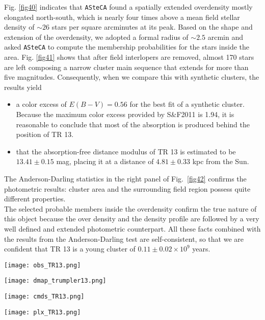 \documentclass[draft]{aa}
\begin{document}
Fig. \ref{fig40} indicates that \texttt{ASteCA} found a spatially extended
overdensity mostly elongated north-south, which is nearly four times
above a mean field stellar density of $\sim26$ stars per square arcminutes at
its peak. Based on the shape and extension of the overdensity, we adopted a
formal radius of $\sim2.5$ arcmin and asked \texttt{ASteCA} to compute the
membership probabilities for the stars inside the area. 
Fig. \ref{fig41} shows that after field interlopers are removed, almost 170
stars are left composing a narrow cluster main sequence that extends for more than
five magnitudes. Consequently, when we compare this with synthetic clusters,
the results yield

\begin{itemize}
\item [a)] a color excess of $E(B-V)=0.56$  for the best fit
of a synthetic cluster. Because the maximum color excess provided by S\&F2011
is 1.94, it is reasonable to conclude that most of the absorption is produced
behind the position of TR 13.
\item [b)] that the absorption-free distance modulus of TR 13 is estimated to be
$13.41\pm0.15$ mag, placing it at a distance of $4.81\pm0.33$ kpc from
the Sun.
\end{itemize}

The Anderson-Darling statistics in the right panel of Fig.~\ref{fig42} confirms the
photometric results: cluster area and the surrounding field region
possess quite different properties.\\

The selected probable members inside the overdensity confirm the
true nature of this object because the over density and the density profile are
followed by a very well defined and extended photometric counterpart. All these
facts combined with the results from the Anderson-Darling test are
self-consistent, so that we are confident that TR 13 is a young cluster of
$0.11\pm0.02\times10^9$ years.

\begin{figure*}[ht]
    \centering
    \texttt{[image: obs\_TR13.png]}
    \caption{Idem Fig. \ref{fig:photom_vdBH85} for TR 13.}
    \label{fig39}
\end{figure*}
\begin{figure*}[ht]
    \centering
    \texttt{[image: dmap\_trumpler13.png]}
    \caption{Idem Fig. \ref{fig:struct_vdBH85} for TR 13.}
    \label{fig40}
\end{figure*}
\begin{figure*}[ht]
    \centering
    \texttt{[image: cmds\_TR13.png]}
    \caption{Idem Fig. \ref{fig:fundpars_vdBH85} for TR 13.}
    \label{fig41}
\end{figure*}
\begin{figure*}[ht]
    \centering
    \texttt{[image: plx\_TR13.png]}
    \caption{Idem Fig. \ref{fig:plx_bys_vdBH85} for TR 13.}
    \label{fig42}
\end{figure*}
\end{document}
